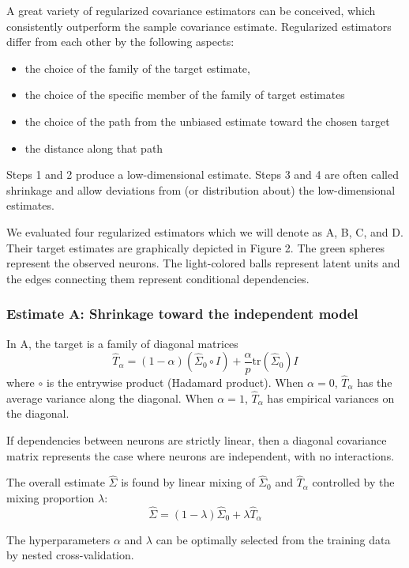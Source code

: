 A great variety of regularized covariance estimators can be conceived, which consistently outperform the sample covariance estimate. Regularized estimators differ from each other by the following aspects:
\begin{itemize}
\item the choice of the family of the target estimate, 
\item the choice of the specific member of the family of target estimates
\item the choice of the path from the unbiased estimate toward the chosen target
\item the distance along that path
\end{itemize}
Steps 1 and 2 produce a low-dimensional estimate. Steps 3 and 4 are often called shrinkage and allow deviations from (or distribution about) the low-dimensional estimates.

We evaluated four regularized estimators which we will denote as A, B, C, and D.  Their target estimates are graphically depicted in Figure 2. 
The green spheres represent the observed neurons. The light-colored balls represent latent units and the edges connecting them represent conditional dependencies.

\subsubsection*{Estimate A: Shrinkage toward the independent model}
In A, the target is a family of diagonal matrices 
\begin{equation}
\hat T_\alpha = (1-\alpha)(\hat\Sigma_0 \circ I) + \frac \alpha p \mbox{tr}(\hat \Sigma_0)I
\end{equation}
where $\circ$ is the entrywise product (Hadamard product). When $\alpha=0$, $\hat T_\alpha$ has the average variance along the diagonal. When $ \alpha=1$, $ \hat T_\alpha$ has empirical variances on the diagonal.

If dependencies between neurons are strictly linear, then a diagonal covariance matrix represents the case where neurons are independent, with no interactions.

The overall estimate $\hat\Sigma$ is found by linear mixing of $\hat\Sigma_0$ and $ \hat T_\alpha$ controlled by the mixing proportion $\lambda$:
\begin{equation}
\hat\Sigma = (1-\lambda)\hat\Sigma_0 + \lambda\hat T_\alpha 
\end{equation}

The hyperparameters $ \alpha$ and $ \lambda$ can be optimally selected from the training data by nested cross-validation.

